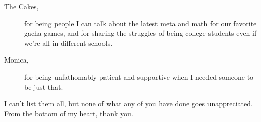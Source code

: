 \begin{description}
    \item[The Cakes,] for being people I can talk about the latest meta and math for our favorite gacha games, and for sharing the struggles of being college students even if we're all in different schools.
    \item[Monica,] for being unfathomably patient and supportive when I needed someone to be just that.
\end{description}

I can't list them all, but none of what any of you have done goes unappreciated. From the bottom of my heart, thank you.
